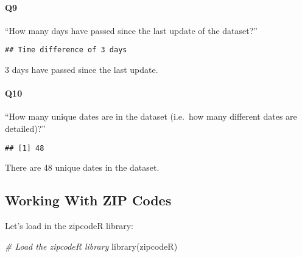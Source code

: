 \documentclass[
]{article}
\newenvironment{Shaded}{\begin{snugshade}}{\end{snugshade}}
\newcommand{\CommentTok}[1]{\textcolor[rgb]{0.56,0.35,0.01}{\textit{#1}}}
\newcommand{\FunctionTok}[1]{\textcolor[rgb]{0.00,0.00,0.00}{#1}}
\newcommand{\NormalTok}[1]{#1}
\newcommand{\SpecialCharTok}[1]{\textcolor[rgb]{0.00,0.00,0.00}{#1}}
\begin{document}
\hypertarget{q9}{%
\paragraph{Q9}\label{q9}}

``How many days have passed since the last update of the dataset?''

\begin{Shaded}
\end{Shaded}

\begin{verbatim}
## Time difference of 3 days
\end{verbatim}

3 days have passed since the last update.

\hypertarget{q10}{%
\paragraph{Q10}\label{q10}}

``How many unique dates are in the dataset (i.e.~how many different
dates are detailed)?''

\begin{Shaded}
\end{Shaded}

\begin{verbatim}
## [1] 48
\end{verbatim}

There are 48 unique dates in the dataset.

\hypertarget{working-with-zip-codes}{%
\subsection{Working With ZIP Codes}\label{working-with-zip-codes}}

Let's load in the zipcodeR library:

\begin{Shaded}
\begin{Highlighting}[]
\CommentTok{\# Load the zipcodeR library}
\FunctionTok{library}\NormalTok{(zipcodeR)}
\end{Highlighting}
\end{Shaded}
\end{document}

